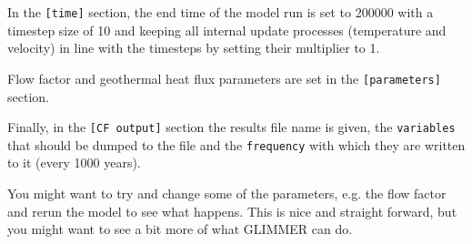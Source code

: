 In the \texttt{[time]} section, the end time of the model run is set to 200000
with a timestep size of 10 and keeping all internal update processes
(temperature and velocity) in line with the timesteps by setting their
multiplier to 1.

Flow factor and geothermal heat flux parameters are set in the
\texttt{[parameters]} section.

Finally, in the \texttt{[CF output]} section the results file name is given,
the \texttt{variables} that should be dumped to the file and the
\texttt{frequency} with which they are written to it (every 1000 years).

You might want to try and change some of the parameters, e.g. the flow factor
and rerun the model to see what happens. This is nice and straight forward, but
you might want to see a bit more of what GLIMMER can do.

